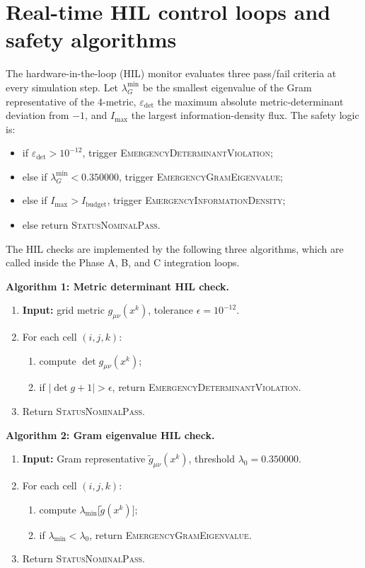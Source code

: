 \section{Real-time HIL control loops and safety algorithms}\label{sec:hil-safety}

The hardware-in-the-loop (HIL) monitor evaluates three pass/fail criteria at
every simulation step.  Let $\lambda_G^{\min}$ be the smallest eigenvalue of
the Gram representative of the 4-metric, $\varepsilon_{\det}$ the maximum
absolute metric-determinant deviation from $-1$, and $I_{\max}$ the largest
information-density flux.  The safety logic is:
\begin{itemize}
\item if $\varepsilon_{\det}>10^{-12}$, trigger
  \textsc{EmergencyDeterminantViolation};
\item else if $\lambda_G^{\min}<0.350000$, trigger
  \textsc{EmergencyGramEigenvalue};
\item else if $I_{\max}>I_{\mathrm{budget}}$, trigger
  \textsc{EmergencyInformationDensity};
\item else return \textsc{StatusNominalPass}.
\end{itemize}

The HIL checks are implemented by the following three algorithms, which are
called inside the Phase A, B, and C integration loops.

\noindent\textbf{Algorithm 1: Metric determinant HIL check.}
\begin{enumerate}
\item \textbf{Input:} grid metric $g_{\mu\nu}(x^k)$, tolerance $\epsilon=10^{-12}$.
\item For each cell $(i,j,k)$:
  \begin{enumerate}
  \item compute $\det g_{\mu\nu}(x^k)$;
  \item if $|\det g+1|>\epsilon$, return \textsc{EmergencyDeterminantViolation}.
  \end{enumerate}
\item Return \textsc{StatusNominalPass}.
\end{enumerate}

\noindent\textbf{Algorithm 2: Gram eigenvalue HIL check.}
\begin{enumerate}
\item \textbf{Input:} Gram representative $\tilde g_{\mu\nu}(x^k)$, threshold $\lambda_0=0.350000$.
\item For each cell $(i,j,k)$:
  \begin{enumerate}
  \item compute $\lambda_{\min}\bigl[\tilde g(x^k)\bigr]$;
  \item if $\lambda_{\min}<\lambda_0$, return \textsc{EmergencyGramEigenvalue}.
  \end{enumerate}
\item Return \textsc{StatusNominalPass}.
\end{enumerate}


